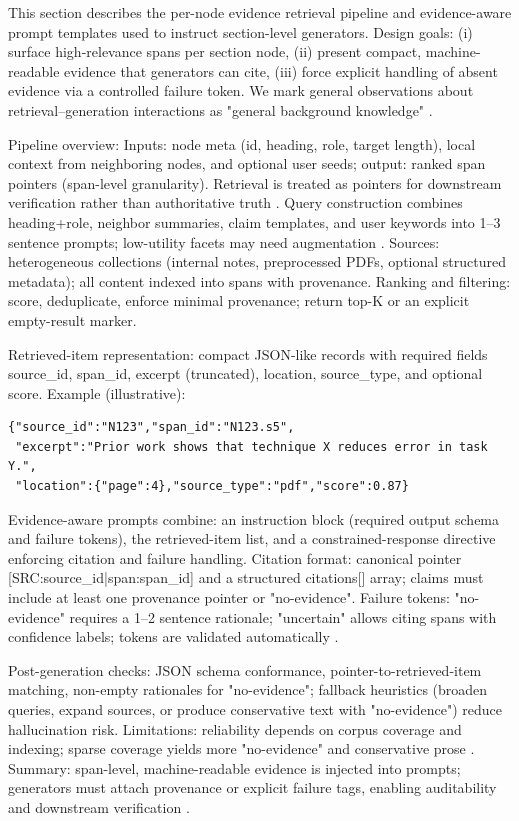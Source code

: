 This section describes the per-node evidence retrieval pipeline and evidence-aware prompt templates used to instruct section-level generators.
Design goals: (i) surface high-relevance spans per section node, (ii) present compact, machine-readable evidence that generators can cite, (iii) force explicit handling of absent evidence via a controlled failure token.
We mark general observations about retrieval–generation interactions as "general background knowledge" \cite{web_huo_2023_retrieving_supporting_evidence_for_generative_qu}.

Pipeline overview:
Inputs: node meta (id, heading, role, target length), local context from neighboring nodes, and optional user seeds; output: ranked span pointers (span-level granularity).
Retrieval is treated as pointers for downstream verification rather than authoritative truth \cite{web_huo_2023_retrieving_supporting_evidence_for_generative_qu}.
Query construction combines heading+role, neighbor summaries, claim templates, and user keywords into 1–3 sentence prompts; low-utility facets may need augmentation \cite{web_macavaney_2018_overcoming_low_utility_facets_for_complex_answer}.
Sources: heterogeneous collections (internal notes, preprocessed PDFs, optional structured metadata); all content indexed into spans with provenance.
Ranking and filtering: score, deduplicate, enforce minimal provenance; return top-K or an explicit empty-result marker.

Retrieved-item representation: compact JSON-like records with required fields source_id, span_id, excerpt (truncated), location, source_type, and optional score.
Example (illustrative):
\begin{verbatim}
{"source_id":"N123","span_id":"N123.s5",
 "excerpt":"Prior work shows that technique X reduces error in task Y.",
 "location":{"page":4},"source_type":"pdf","score":0.87}
\end{verbatim}

Evidence-aware prompts combine: an instruction block (required output schema and failure tokens), the retrieved-item list, and a constrained-response directive enforcing citation and failure handling.
Citation format: canonical pointer [SRC:source_id|span:span_id] and a structured citations[] array; claims must include at least one provenance pointer or "no-evidence".
Failure tokens: "no-evidence" requires a 1–2 sentence rationale; "uncertain" allows citing spans with confidence labels; tokens are validated automatically \cite{web_wang_2025_derag_black_box_adversarial_attacks_on_multiple_}.

Post-generation checks: JSON schema conformance, pointer-to-retrieved-item matching, non-empty rationales for "no-evidence"; fallback heuristics (broaden queries, expand sources, or produce conservative text with "no-evidence") reduce hallucination risk.
Limitations: reliability depends on corpus coverage and indexing; sparse coverage yields more "no-evidence" and conservative prose \cite{web_macavaney_2018_overcoming_low_utility_facets_for_complex_answer}.
Summary: span-level, machine-readable evidence is injected into prompts; generators must attach provenance or explicit failure tags, enabling auditability and downstream verification \cite{web_huo_2023_retrieving_supporting_evidence_for_generative_qu}.